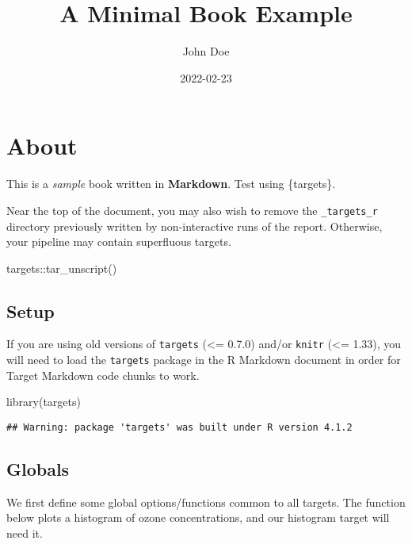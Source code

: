 \documentclass[
]{book}
\title{A Minimal Book Example}
\author{John Doe}
\date{2022-02-23}
\newenvironment{Shaded}{\begin{snugshade}}{\end{snugshade}}
\newcommand{\FunctionTok}[1]{\textcolor[rgb]{0.00,0.00,0.00}{#1}}
\newcommand{\NormalTok}[1]{#1}
\newcommand{\SpecialCharTok}[1]{\textcolor[rgb]{0.00,0.00,0.00}{#1}}
\begin{document}
\maketitle

{
\setcounter{tocdepth}{1}
\tableofcontents
}
\hypertarget{about}{%
\chapter{About}\label{about}}

This is a \emph{sample} book written in \textbf{Markdown}. Test using \{targets\}.

Near the top of the document, you may also wish to remove the \texttt{\_targets\_r} directory previously written by non-interactive runs of the report. Otherwise, your pipeline may contain superfluous targets.

\begin{Shaded}
\begin{Highlighting}[]
\NormalTok{targets}\SpecialCharTok{::}\FunctionTok{tar\_unscript}\NormalTok{()}
\end{Highlighting}
\end{Shaded}

\hypertarget{setup}{%
\section{Setup}\label{setup}}

If you are using old versions of \texttt{targets} (\textless= 0.7.0) and/or \texttt{knitr} (\textless= 1.33), you will need to load the \texttt{targets} package in the R Markdown document in order for Target Markdown code chunks to work.

\begin{Shaded}
\begin{Highlighting}[]
\FunctionTok{library}\NormalTok{(targets)}
\end{Highlighting}
\end{Shaded}

\begin{verbatim}
## Warning: package 'targets' was built under R version 4.1.2
\end{verbatim}

\hypertarget{globals}{%
\section{Globals}\label{globals}}

We first define some global options/functions common to all targets. The function below plots a histogram of ozone concentrations, and our histogram target will need it.
\end{document}
